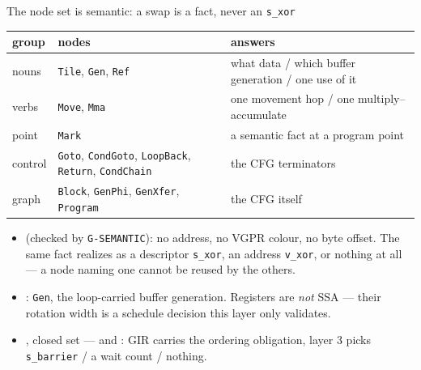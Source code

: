\begin{frame}{The node set is semantic: a swap is a fact, never an \texttt{s\_xor}}
\centering\scriptsize
\begin{tabular}{@{}llp{5.2cm}@{}}
\toprule
group & nodes & answers \\
\midrule
nouns   & \texttt{Tile}, \texttt{Gen}, \texttt{Ref} & what data / which buffer generation / one use of it \\
verbs   & \texttt{Move}, \texttt{Mma} & one movement hop / one multiply--accumulate \\
point   & \texttt{Mark} & a semantic fact at a program point \\
control & \texttt{Goto}, \texttt{CondGoto}, \texttt{LoopBack}, \texttt{Return}, \texttt{CondChain} & the CFG terminators \\
graph   & \texttt{Block}, \texttt{GenPhi}, \texttt{GenXfer}, \texttt{Program} & the CFG itself \\
\bottomrule
\end{tabular}

\vspace{5pt}
\begin{itemize}\scriptsize
  \item {} (checked by \texttt{G-SEMANTIC}): no address, no VGPR colour,
        no byte offset. The same fact realizes as a descriptor \texttt{s\_xor}, an address
        \texttt{v\_xor}, or nothing at all --- a node naming one cannot be reused by the others.
  \item {}: \texttt{Gen}, the loop-carried buffer generation. Registers are
        \emph{not} SSA --- their rotation width is a schedule decision this layer only validates.
  \item {}, closed set --- and : GIR carries the
        ordering obligation, layer 3 picks \texttt{s\_barrier} / a wait count / nothing.
\end{itemize}
\end{frame}
